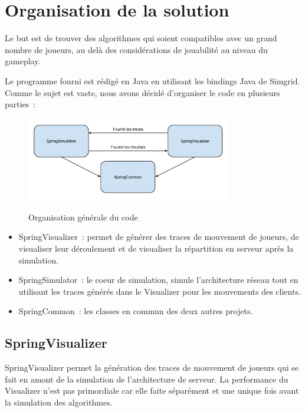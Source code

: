 \section{Organisation de la solution}

Le but est de trouver des algorithmes qui soient compatibles avec un grand nombre de joueurs, au delà des considérations de jouabilité au niveau du gameplay.

Le programme fourni est rédigé en Java en utilisant les bindings Java de Simgrid.
Comme le sujet est vaste, nous avons décidé d'organiser le code en plusieurs parties~: 

\begin{figure}[h!]
	\centering
	\includegraphics[width=0.8\textwidth]{orga_generale.png}
	\\[0.2cm]
	\caption{Organisation générale du code}
	\label{fig:orga}
\end{figure}

\begin{itemize}
\item SpringVisualizer~: permet de générer des traces de mouvement de joueurs, de visualiser leur déroulement et de visualiser la répartition en serveur après la simulation.
\item SpringSimulator~: le coeur de simulation, simule l'architecture réseau tout en utilisant les traces générés dans le Visualizer pour les mouvements des clients.
\item SpringCommon~: les classes en commun des deux autres projets.
\end{itemize}

\subsection{SpringVisualizer}

SpringVisualizer permet la génération des traces de mouvement de joueurs qui se fait en amont de la simulation de l'architecture de serveur.
La performance du Visualizer n'est pas primordiale car elle faite séparément et une unique fois avant la simulation des algorithmes.

